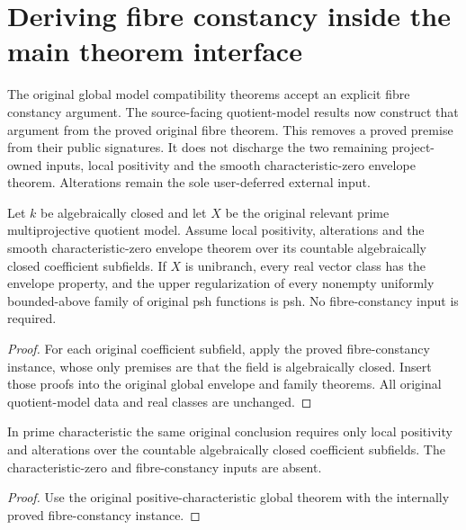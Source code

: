 \section{Deriving fibre constancy inside the main theorem interface}

The original global model compatibility theorems accept an explicit fibre
constancy argument. The source-facing quotient-model results now construct
that argument from the proved original fibre theorem. This removes a proved
premise from their public signatures. It does not discharge the two remaining
project-owned inputs, local positivity and the smooth characteristic-zero
envelope theorem. Alterations remain the sole user-deferred external input.

\begin{theorem}
\label{thm:proved-fibres-quotient-main}
\leanok
Let $k$ be algebraically closed and let $X$ be the original relevant prime
multiprojective quotient model. Assume local positivity, alterations and the
smooth characteristic-zero envelope theorem over its countable algebraically
closed coefficient subfields. If $X$ is unibranch, every real vector class has
the envelope property, and the upper regularization of every nonempty uniformly
bounded-above family of original psh functions is psh. No fibre-constancy input
is required.
\end{theorem}
\begin{proof}
For each original coefficient subfield, apply the proved fibre-constancy
instance, whose only premises are that the field is algebraically closed.
Insert those proofs into the original global envelope and family theorems.
All original quotient-model data and real classes are unchanged.
\end{proof}

\begin{theorem}
\label{thm:proved-fibres-quotient-charp}
\leanok
In prime characteristic the same original conclusion requires only local
positivity and alterations over the countable algebraically closed coefficient
subfields. The characteristic-zero and fibre-constancy inputs are absent.
\end{theorem}
\begin{proof}
Use the original positive-characteristic global theorem with the internally
proved fibre-constancy instance.
\end{proof}

